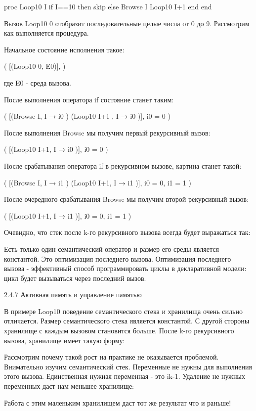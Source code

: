 proc {Loop10 I}
if I==10 then skip
else
{Browse I}
{Loop10 I+1}
end
end

Вызов {Loop10 0} отобразит последовательные целые числа от 0 до 9. Рассмотрим как выполняется процедура.

Начальное состояние исполнения такое:

( [({Loop10 0}, E0)],
 )

где E0 - среда вызова.

После выполнения оператора if состояние станет таким:

( [({Browse I}, {I → i0 }) ({Loop10 I+1} , {I → i0 })],
{i0 = 0}  )

После выполнения Browse мы получим первый рекурсивный вызов:

( [({Loop10 I+1}, {I → i0 })],
{i0 = 0}  )

После срабатывания оператора if в рекурсивном вызове, картина станет такой:

( [({Browse I}, {I → i1 }) ({Loop10 I+1}, {I → i1 })],
{i0 = 0, i1 = 1}  )

После очередного срабатывания Browse мы получим второй рекурсивный вызов:

( [({Loop10 I+1}, {I → i1 })],
{i0 = 0, i1 = 1}  )

Очевидно, что стек после k-го рекурсивного вызова всегда будет выражаться так:



Есть только один семантический оператор и размер его среды является константой. Это оптимизация последнего вызова. Оптимизация последнего вызова - эффективный способ программировать циклы в декларативной модели: цикл будет вызываться через последний вызов.

2.4.7 Активная память и управление памятью

В примере Loop10 поведение семантического стека и хранилища очень сильно отличается. Размер семантического стека является константой. С другой стороны хранилище с каждым вызовом становится больше. После k-го рекурсивного вызова, хранилище имеет такую форму:



Рассмотрим почему такой рост на практике не оказывается проблемой. Внимательно изучим семантический стек. Переменные  не нужны для выполнения этого вызова. Единственная нужная переменная - это ik-1. Удаление не нужных переменных даст нам меньшее хранилище:



Работа с этим маленьким хранилищем даст тот же результат что и раньше!

